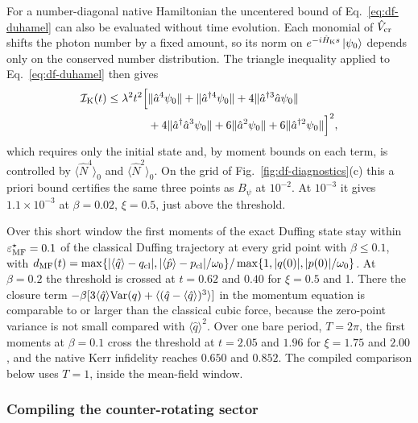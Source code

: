 \documentclass[pra,twocolumn,superscriptaddress,nofootinbib,floatfix]{revtex4-2}
\theoremstyle{remark}
\newcommand{\revcolor}{\color{blue}}
\DeclareRobustCommand{\rev}[1]{{\revcolor #1}}
\begin{document}
\rev{For a number-diagonal native Hamiltonian the uncentered bound of Eq.~\eqref{eq:df-duhamel} can also be evaluated without time evolution.} \rev{Each monomial of \(\hat V_{\rm cr}\) shifts the photon number by a fixed amount, so its norm on \(e^{-i\hat H_{\rm K}s}\ket{\psi_0}\) depends only on the conserved number distribution.} \rev{The triangle inequality applied to Eq.~\eqref{eq:df-duhamel} then gives}
\begingroup\revcolor
\begin{align}
\mathcal I_{\rm K}(t)\le\lambda^2t^2\Big[&\|\hat a^4\psi_0\|+\|\hat a^{\dagger4}\psi_0\|+4\|\hat a^{\dagger3}\hat a\psi_0\|\nonumber\\
&+4\|\hat a^\dagger\hat a^3\psi_0\|+6\|\hat a^2\psi_0\|+6\|\hat a^{\dagger2}\psi_0\|\Big]^2 ,
\label{eq:df-apriori}
\end{align}
\endgroup
\rev{which requires only the initial state and, by moment bounds on each term, is controlled by \(\langle\hat N^4\rangle_0\) and \(\langle\hat N^2\rangle_0\).} \rev{On the grid of Fig.~\ref{fig:df-diagnostics}(c) this a priori bound certifies the same three points as \(B_\psi\) at \(10^{-2}\).} \rev{At \(10^{-3}\) it gives \(1.1\times10^{-3}\) at \(\beta=0.02\), \(\xi=0.5\), just above the threshold.}

\rev{Over this short window the first moments of the exact Duffing state stay within \(\varepsilon^\star_{\rm MF}=0.1\) of the classical Duffing trajectory at every grid point with \(\beta\le0.1\), with \(d_{\rm MF}(t)=\max\{|\langle\hat q\rangle-q_{\rm cl}|,|\langle\hat p\rangle-p_{\rm cl}|/\omega_0\}/\max\{1,|q(0)|,|p(0)|/\omega_0\}\).} \rev{At \(\beta=0.2\) the threshold is crossed at \(t=0.62\) and \(0.40\) for \(\xi=0.5\) and 1.} \rev{There the closure term \(-\beta[3\langle\hat q\rangle{\rm Var}(q)+\langle(\hat q-\langle\hat q\rangle)^3\rangle]\) in the momentum equation is comparable to or larger than the classical cubic force, because the zero-point variance is not small compared with \(\langle\hat q\rangle^2\).} \rev{Over one bare period, \(T=2\pi\), the first moments at \(\beta=0.1\) cross the threshold at \(t=2.05\) and \(1.96\) for \(\xi=1.75\) and \(2.00\), and the native Kerr infidelity reaches \(0.650\) and \(0.852\).} \rev{The compiled comparison below uses \(T=1\), inside the mean-field window.}

\subsubsection{Compiling the counter-rotating sector}
\label{subsec:df-compile}
\end{document}
